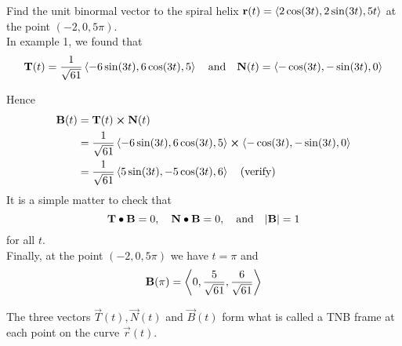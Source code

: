 \documentclass[handout]{ximera}
\begin{document}
\begin{example}[Example 2]
Find the unit binormal vector to the spiral helix $\mathbf r(t) =  \left\langle 2\cos(3t), 2\sin(3t), 5t\right\rangle$ at the point $(-2, 0, 5\pi)$.\\
In example 1, we found that
\[
\mathbf T(t) = \frac{1}{\sqrt{61}} \left\langle -6 \sin(3t), 6\cos(3t), 5\right\rangle \quad \text{and} \quad \mathbf N(t) = \left\langle -\cos(3t), -\sin(3t), 0\right\rangle
\]

Hence
\begin{align*}
\mathbf B(t) &= \mathbf T(t) \boldsymbol\times \mathbf N(t)\\
          &= \frac{1}{\sqrt{61}} \left\langle -6 \sin(3t), 6\cos(3t), 5\right\rangle \boldsymbol\times \left\langle -\cos(3t), -\sin(3t), 0\right\rangle\\
          &= \frac{1}{\sqrt{61}} \left\langle 5 \sin(3t), -5 \cos(3t), 6\right\rangle \quad \text{(verify)}
\end{align*}
It is a simple matter to check that 
\[
\mathbf T \bullet \mathbf B = 0, \quad \mathbf N \bullet \mathbf B = 0, \quad \text{and} \quad |\mathbf B| = 1
\]
for all $t$.\\
Finally, at the point $(-2, 0, 5\pi)$ we have $t = \pi$ and
\[
\mathbf B(\pi) = \left\langle 0, \frac{5}{\sqrt {61}}, \frac{6}{\sqrt{61}}\right\rangle
\]
\end{example}

The three vectors $\vec T(t), \vec N(t)$ and $\vec B(t)$ form what is called a TNB frame at each point on the curve $\vec r(t)$.
\end{document}
